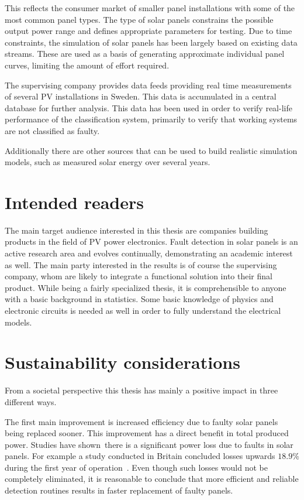 This reflects the consumer market of smaller panel installations with some of the most common panel types.
The type of solar panels constrains the possible output power range and defines appropriate parameters for testing.
Due to time constraints, the simulation of solar panels has been largely based on existing data streams.
These are used as a basis of generating approximate individual panel curves, limiting the amount of effort required.

The supervising company provides data feeds providing real time measurements of several PV installations in Sweden.
This data is accumulated in a central database for further analysis.
This data has been used in order to verify real-life performance of the classification system, primarily to verify that working systems are not classified as faulty.

Additionally there are other sources that can be used to build realistic simulation models, such as measured solar energy over several years.

\section{Intended readers}
The main target audience interested in this thesis are companies building products in the field of PV power electronics.
Fault detection in solar panels is an active research area and evolves continually, demonstrating an academic interest as well.
The main party interested in the results is of course the supervising company, whom are likely to
integrate a functional solution into their final product.
While being a fairly specialized thesis, it is comprehensible to anyone with a basic background in statistics.
Some basic knowledge of physics and electronic circuits is needed as well in order to fully understand the electrical models.

\section{Sustainability considerations}
From a societal perspective this thesis has mainly a positive impact in three different ways.

The first main improvement is increased efficiency due to faulty solar panels being replaced sooner.
This improvement has a direct benefit in total produced power.
Studies have shown there is a significant power loss due to faults in solar panels.
For example a study conducted in Britain concluded losses upwards $18.9\%$ during the first year of operation~\cite{Firth2010}.
Even though such losses would not be completely eliminated, it is reasonable to conclude that more efficient and reliable detection routines results in faster replacement of faulty panels.

